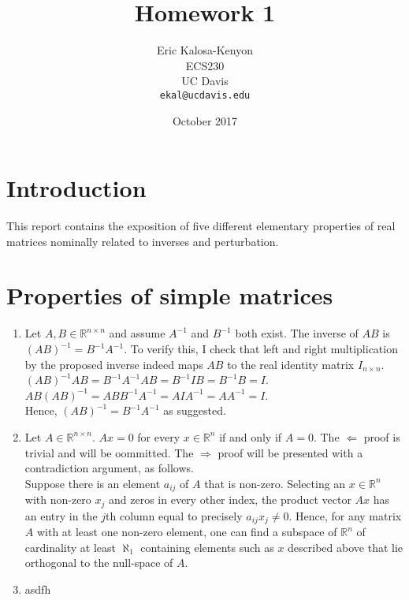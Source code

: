 \documentclass[12pt,fleqn,leqno,letterpaper]{article}
\title{Homework 1}
\author{Eric Kalosa-Kenyon\\
\small{ECS230}\\
\small{UC Davis}\\
\small{\texttt{ekal@ucdavis.edu}}
}
\date{October 2017}
\begin{document}
\maketitle



% 


\section{Introduction}
This report contains the exposition of five different elementary properties of
real matrices nominally related to inverses and perturbation.

\section{Properties of simple matrices}
\begin{enumerate}
    \item Let $A,B \in \mathbb{R}^{n\times n}$ and assume $A^{-1}$ and $B^{-1}$
        both exist. The inverse of $AB$ is $(AB)^{-1} = B^{-1}A^{-1}$. To verify
        this, I check that left and right multiplication by the proposed inverse
        indeed maps $AB$ to the real identity matrix $I_{n\times n}$.\\
        $(AB)^{-1}AB = B^{-1}A^{-1}AB = B^{-1}IB = B^{-1}B = I$.\\
        $AB(AB)^{-1} = ABB^{-1}A^{-1} = AIA^{-1} = AA^{-1} = I$.\\
        Hence, $(AB)^{-1} = B^{-1}A^{-1}$ as suggested.

    \item Let $A\in\mathbb{R}^{n\times n}$. $Ax=0$ for every $x\in\mathbb{R}^n$
        if and only if $A=0$. The $\Leftarrow$ proof is trivial and will be
        oommitted. The $\Rightarrow$ proof will be presented with a contradiction
        argument, as follows.\\
        Suppose there is an element $a_{ij}$ of $A$ that is non-zero. Selecting
        an $x\in\mathbb{R}^n$ with non-zero $x_j$ and zeros in every other
        index, the product vector $Ax$ has an entry in the $j$th column equal to
        precisely $a_{ij}x_j\neq 0$. Hence, for any matrix $A$ with at least one
        non-zero element, one can find a subspace of $\mathbb{R}^n$ of
        cardinality at least $\aleph_1$ containing elements such as $x$
        described above that lie orthogonal to the null-space of $A$.

    \item asdfh
\end{enumerate}


% 
\end{document}

